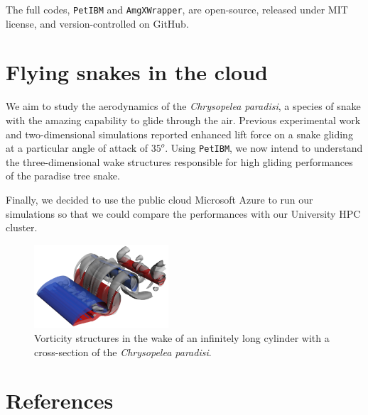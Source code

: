 \documentclass[review]{elsarticle}
\begin{document}
The full codes, \texttt{PetIBM} and \texttt{AmgXWrapper}, are open-source, released under MIT license, and version-controlled on GitHub.


\section{Flying snakes in the cloud}

We aim to study the aerodynamics of the \textit{Chrysopelea paradisi}, a species of snake with the amazing capability to glide through the air.
Previous experimental work \cite{Holden_et_al_2014} and two-dimensional simulations \cite{Krishnan_et_al_2014} reported enhanced lift force on a snake gliding at a particular angle of attack of $35^o$.
Using \texttt{PetIBM}, we now intend to understand the three-dimensional wake structures responsible for high gliding performances of the paradise tree snake.

Finally, we decided to use the public cloud Microsoft Azure to run our simulations so that we could compare the performances with our University HPC cluster.

\begin{figure}[h!]
\centering
\includegraphics[width=5cm]{images/flying_snake_petibm.png}
\caption{Vorticity structures in the wake of an infinitely long cylinder with a cross-section of the \textit{Chrysopelea paradisi}.}
\label{flying_snake_petibm}
\end{figure}

\section*{References}


\end{document}
